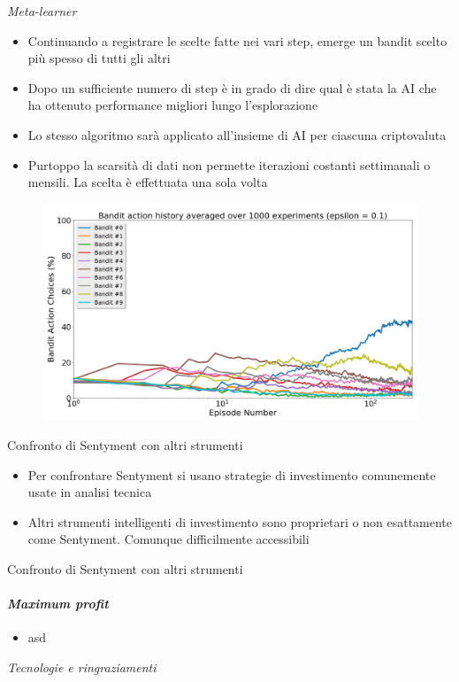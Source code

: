 \documentclass{beamer}
\begin{document}
\begin{frame}{\textit{Meta-learner}}
\begin{itemize}
\item Continuando a registrare le scelte fatte nei vari step, emerge un bandit scelto più spesso di tutti gli altri
\item Dopo un sufficiente numero di step è in grado di dire qual è stata la AI che ha ottenuto performance migliori lungo l'esplorazione
\item Lo stesso algoritmo sarà applicato all'insieme di AI per ciascuna criptovaluta
\item Purtoppo la scarsità di dati non permette iterazioni costanti settimanali o mensili. La scelta è effettuata una sola volta
\end{itemize}
\begin{figure}
        \centering
        \includegraphics[width=.5\linewidth]{bandit_choice_1000}
\end{figure}
\end{frame}

\begin{frame}{Confronto di Sentyment con altri strumenti}
\begin{itemize}
\item Per confrontare Sentyment si usano strategie di investimento comunemente usate in analisi tecnica
\item Altri strumenti intelligenti di investimento sono proprietari o non esattamente come Sentyment. Comunque difficilmente accessibili
\end{itemize}
\end{frame}

\begin{frame}{Confronto di Sentyment con altri strumenti}
\framesubtitle{\textit{Maximum profit}}
\begin{itemize}
\item asd
\end{itemize}
\end{frame}


\begin{frame}{\textit{Tecnologie e ringraziamenti}}
\end{frame}
\end{document}
